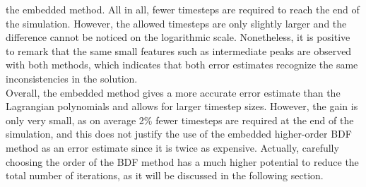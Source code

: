 \noindent the embedded method. All in all, fewer timesteps are required to reach the end of the simulation. However, the allowed timesteps are only slightly larger and the difference cannot be noticed on the logarithmic scale. Nonetheless, it is positive to remark that the same small features such as intermediate peaks are observed with both methods, which indicates that both error estimates recognize the same inconsistencies in the solution. \\
Overall, the embedded method gives a more accurate error estimate than the Lagrangian polynomials and allows for larger timestep sizes. However, the gain is only very small, as on average 2\% fewer timesteps are required at the end of the simulation, and this does not justify the use of the embedded higher-order BDF method as an error estimate since it is twice as expensive. Actually, carefully choosing the order of the BDF method has a much higher potential to reduce the total number of iterations, as it will be discussed in the following section.

